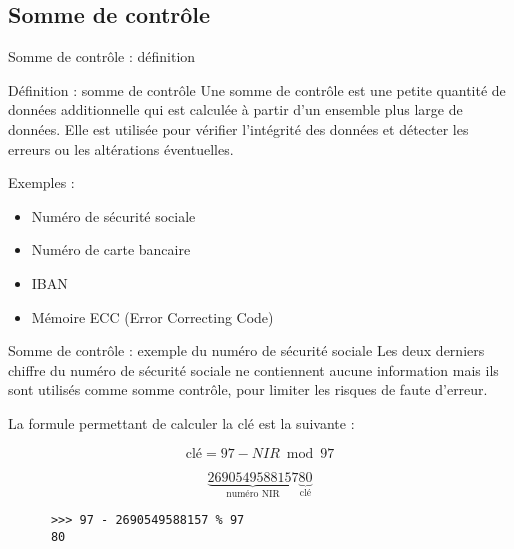 \subsection*{Somme de contrôle}

\begin{frame}{Somme de contrôle : définition}
  \begin{block}{Définition : somme de contrôle}
    Une somme de contrôle est une petite quantité de données additionnelle qui est calculée à partir d'un ensemble plus large de données. Elle est utilisée pour vérifier l'intégrité des données et détecter les erreurs ou les altérations éventuelles.
  \end{block}

  Exemples :

  \begin{itemize}
    \item Numéro de sécurité sociale
    \item Numéro de carte bancaire
    \item IBAN
    \item Mémoire ECC (Error Correcting Code)
  \end{itemize}
\end{frame}

\begin{frame}[fragile]{Somme de contrôle : exemple du numéro de sécurité sociale}
  Les deux derniers chiffre du numéro de sécurité sociale ne contiennent aucune information mais ils sont utilisés comme somme contrôle, pour limiter les risques de faute d'erreur.

  La formule permettant de calculer la clé est la suivante :

  $$
    \textrm{clé} = 97 - NIR \bmod 97
  $$

  $$
    \underbrace{2 69 05 49 588 157}_{\textrm{numéro NIR}}\underbrace{80}_{\textrm{clé}}
  $$

  \begin{verbatim}
      >>> 97 - 2690549588157 % 97
      80
    \end{verbatim}
\end{frame}